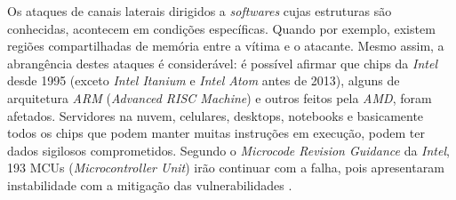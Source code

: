 \documentclass[
	article,			    %
	12pt,				    %
	oneside,			    %
	a4paper,			    %
	chapter=TITLE,		    %
	section=TITLE,		    %
	subsection=TITLE,	    %
	english,			    %
	brazil,				    %
	sumario=tradicional
]{abntex2}
\begin{document}
\begin{comment}
\subsection{Questões de Pesquisa}
\begin{itemize}
    \item Questões abordadas por esta pesquisa:
    \begin{enumerate}
	    \item \label{q1} Quais informações, como fluxo condicional e estrutura de memória, são necessárias para se aplicar execução especulativa em um software?
	    \item \label{q2} Além de usar o tempo de retorno da memória cache para extrair as informações da própria memória cache, quais ataques de hardware também podem ser usados para desviar dados deste canal lateral?
	    \item \label{q3} Quais endereços da memória cache são acessíveis a um programa de nível de usuário, que podem serem utilizados como canal alternativo?
	    \item \label{q4} Quais são os outros canais laterais existentes (além da memória cache), que outros autores já exploraram?
	\end{enumerate}
    \item Questões de pesquisa para trabalhos futuros:
    \begin{enumerate}
	    \item \label{qf1} Como executar instruções mais complexas, além de somente desvios de informação, aproveitando-se da execução especulativa?
	    \item \label{qf1} Segundo \citeonline{Kocher2018spectre} até mesmo códigos que não contenham instruções com ramificações condicionais estão em risco. Como explorá-los?
	\end{enumerate}
\end{itemize}
\end{comment}
Os ataques de canais laterais dirigidos a \emph{softwares} cujas estruturas são conhecidas, acontecem em condições específicas. Quando por exemplo, existem regiões compartilhadas de memória entre a vítima e o atacante. Mesmo assim, a abrangência destes ataques é considerável: é possível afirmar que chips da \emph{Intel} desde 1995 (exceto \emph{Intel Itanium} e \emph{Intel Atom} antes de 2013), alguns de arquitetura \emph{ARM} (\emph{Advanced RISC Machine}) e outros feitos pela \emph{AMD}, foram afetados. Servidores na nuvem, celulares, desktops, notebooks e basicamente todos os chips que podem manter muitas instruções em execução, podem ter dados sigilosos comprometidos. Segundo o \emph{Microcode Revision Guidance} da \emph{Intel}, 193 MCUs (\emph{Microcontroller Unit}) irão continuar com a falha, pois apresentaram instabilidade com a mitigação das vulnerabilidades \cite{intel-mug}.
\end{document}
